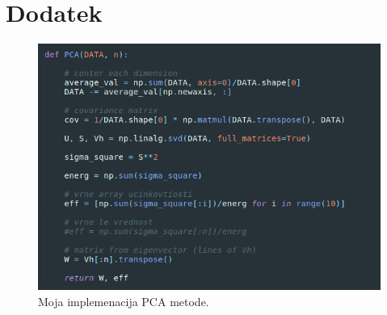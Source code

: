 \documentclass[11pt,a4paper]{article}
\begin{document}
\clearpage

\section{Dodatek}

\begin{figure}[h]
    \centering
    \hbox{\hspace{5em}\includegraphics[scale=0.8]{PCA}}
    \caption{Moja implemenacija PCA metode.}
    \label{10}
\end{figure}
\end{document}
